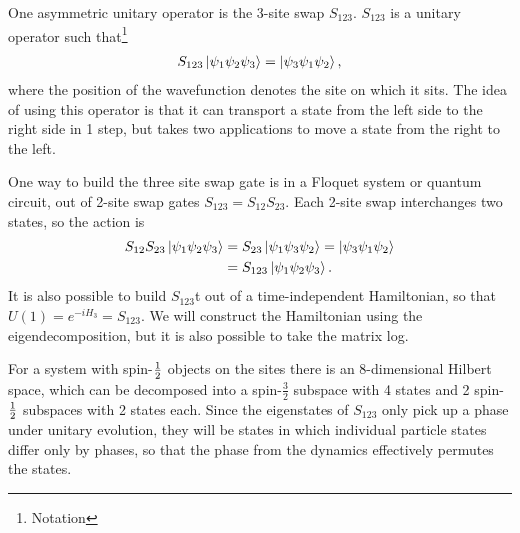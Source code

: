 One asymmetric unitary operator is the 3-site swap $S_{123}$. $S_{123}$ is a unitary operator such that\footnote{Notation}
\begin{align}
S_{123}\left|\psi_1\psi_2\psi_3\right\rangle =\left|\psi_3\psi_1\psi_2\right\rangle, \label{eqn:condition}
\end{align}
where the position of the wavefunction denotes the site on which it sits. The idea of using this operator is that it can transport a state from the left side to the right side in 1 step, but takes two applications to move a state from the right to the left.

One way to build the three site swap gate is in a Floquet system or quantum circuit, out of 2-site swap gates $S_{123} = S_{12}S_{23}$. Each 2-site swap interchanges two states, so the action is 
\begin{align}
S_{12}S_{23}\left|\psi_1\psi_2\psi_3\right\rangle &= S_{23}\left|\psi_1\psi_3\psi_2\right\rangle = 
	\left|\psi_3\psi_1\psi_2\right\rangle\nonumber\\
&= S_{123}\left|\psi_1\psi_2\psi_3\right\rangle.
\end{align}
It is also possible to build $S_{123}$t out of a time-independent Hamiltonian, so that $U(1) = e^{-iH_3} = S_{123}$. We will construct the Hamiltonian using the eigendecomposition, but it is also possible to take the matrix log.

For a system with spin-$\frac{1}{2}$ objects on the sites there is an 8-dimensional Hilbert space, which can be decomposed into a spin-$\frac{3}{2}$ subspace with 4 states and 2 spin-$\frac{1}{2}$ subspaces with 2 states each. Since the eigenstates of $S_{123}$ only pick up a phase under unitary evolution, they will be states in which individual particle states differ only by phases, so that the phase from the dynamics effectively permutes the states. 

